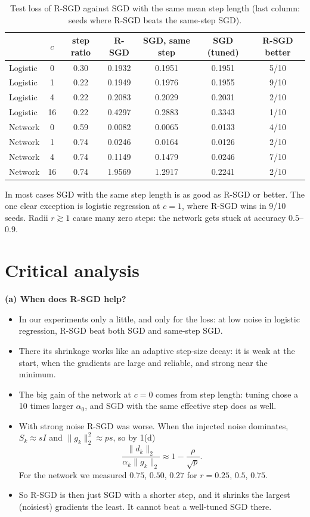 \documentclass[11pt,a4paper]{article}
\newcommand{\norm}[1]{\lVert #1\rVert_2}
\begin{document}
\begin{table}[H]
\centering
\small
\begin{tabular}{@{}lcccccc@{}}
\toprule
& $c$ & step ratio & R-SGD & SGD, same step & SGD (tuned) & R-SGD better \\
\midrule
Logistic & 0 & 0.30 & 0.1932 & 0.1951 & 0.1951 & 5/10 \\
Logistic & 1 & 0.22 & 0.1949 & 0.1976 & 0.1955 & 9/10 \\
Logistic & 4 & 0.22 & 0.2083 & 0.2029 & 0.2031 & 2/10 \\
Logistic & 16 & 0.22 & 0.4297 & 0.2883 & 0.3343 & 1/10 \\
Network & 0 & 0.59 & 0.0082 & 0.0065 & 0.0133 & 4/10 \\
Network & 1 & 0.74 & 0.0246 & 0.0164 & 0.0126 & 2/10 \\
Network & 4 & 0.74 & 0.1149 & 0.1479 & 0.0246 & 7/10 \\
Network & 16 & 0.74 & 1.9569 & 1.2917 & 0.2241 & 2/10 \\
\bottomrule
\end{tabular}
\caption{Test loss of R-SGD against SGD with the same mean step length (last column: seeds where
R-SGD beats the same-step SGD).}
\label{tab:matched}
\end{table}

In most cases SGD with the same step length is as good as R-SGD or better. The one clear exception is
logistic regression at $c=1$, where R-SGD wins in 9/10 seeds. Radii $r\gtrsim1$ cause many zero steps:
the network gets stuck at accuracy $0.5$--$0.9$.

\section{Critical analysis}

\textbf{(a) When does R-SGD help?}
\begin{itemize}
\item In our experiments only a little, and only for the loss: at low noise in logistic regression,
R-SGD beat both SGD and same-step SGD.
\item There its shrinkage works like an adaptive step-size decay: it is weak at the start, when the
gradients are large and reliable, and strong near the minimum.
\item The big gain of the network at $c=0$ comes from step length: tuning chose a 10 times larger
$\alpha_0$, and SGD with the same effective step does as well.
\item With strong noise R-SGD was worse. When the injected noise dominates, $S_k\approx sI$ and
$\norm{g_k}^2\approx ps$, so by 1(d)
\begin{equation*}
\frac{\norm{d_k}}{\alpha_k\norm{g_k}}\approx1-\frac{\rho}{\sqrt p}.
\end{equation*}
For the network we measured $0.75$, $0.50$, $0.27$ for $r=0.25$, $0.5$, $0.75$.
\item So R-SGD is then just SGD with a shorter step, and it shrinks the largest (noisiest) gradients
the least. It cannot beat a well-tuned SGD there.
\end{itemize}
\end{document}

